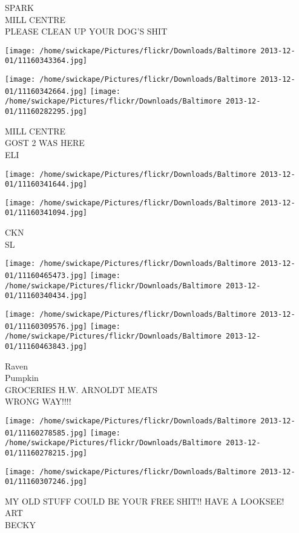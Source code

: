 \documentclass[10pt,letterpaper]{article}
\begin{document}
SPARK\\
MILL CENTRE\\
PLEASE CLEAN UP YOUR DOG'S SHIT
\pagebreak

\texttt{[image: /home/swickape/Pictures/flickr/Downloads/Baltimore 2013-12-01/11160343364.jpg]}

\vspace{0.25in}
\texttt{[image: /home/swickape/Pictures/flickr/Downloads/Baltimore 2013-12-01/11160342664.jpg]}
\texttt{[image: /home/swickape/Pictures/flickr/Downloads/Baltimore 2013-12-01/11160282295.jpg]}

MILL CENTRE\\
GOST 2 WAS HERE\\
ELI
\pagebreak

\texttt{[image: /home/swickape/Pictures/flickr/Downloads/Baltimore 2013-12-01/11160341644.jpg]}

\vspace{0.25in}
\texttt{[image: /home/swickape/Pictures/flickr/Downloads/Baltimore 2013-12-01/11160341094.jpg]}

CKN\\
SL
\pagebreak

\texttt{[image: /home/swickape/Pictures/flickr/Downloads/Baltimore 2013-12-01/11160465473.jpg]}
\texttt{[image: /home/swickape/Pictures/flickr/Downloads/Baltimore 2013-12-01/11160340434.jpg]}

\texttt{[image: /home/swickape/Pictures/flickr/Downloads/Baltimore 2013-12-01/11160309576.jpg]}
\texttt{[image: /home/swickape/Pictures/flickr/Downloads/Baltimore 2013-12-01/11160463843.jpg]}

Raven\\
Pumpkin\\
GROCERIES H.W. ARNOLDT MEATS\\
WRONG WAY!!!!
\pagebreak

\texttt{[image: /home/swickape/Pictures/flickr/Downloads/Baltimore 2013-12-01/11160278585.jpg]}
\texttt{[image: /home/swickape/Pictures/flickr/Downloads/Baltimore 2013-12-01/11160278215.jpg]}

\vspace{0.25in}
\texttt{[image: /home/swickape/Pictures/flickr/Downloads/Baltimore 2013-12-01/11160307246.jpg]}

MY OLD STUFF COULD BE YOUR FREE SHIT!! HAVE A LOOKSEE!\\
ART\\
BECKY
\pagebreak
\end{document}
